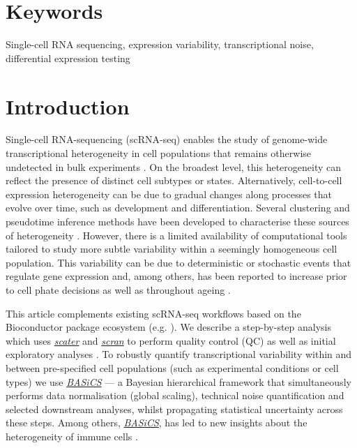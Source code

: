 \documentclass[9pt,a4paper,]{extarticle}
\begin{document}
\section*{Keywords}
Single-cell RNA sequencing, expression variability, transcriptional noise, differential expression testing


\clearpage
\pagestyle{main}

\hypertarget{introduction}{%
\section{Introduction}\label{introduction}}

Single-cell RNA-sequencing (scRNA-seq) enables the study of genome-wide
transcriptional heterogeneity in cell populations that remains otherwise
undetected in bulk experiments \citep{Stegle2015, Prakadan2017, Patange2018}.
On the broadest level, this heterogeneity can reflect the presence of distinct
cell subtypes or states.
Alternatively, cell-to-cell expression heterogeneity can be due to gradual
changes along processes that evolve over time, such as development and differentiation.
Several clustering and pseudotime inference methods have been developed to
characterise these sources of heterogeneity \citep{Kiselev2019, Saelens2019}.
However, there is a limited availability of computational tools tailored
to study more subtle variability within a seemingly homogeneous cell population.
This variability can be due to deterministic or stochastic events that regulate gene expression and, among others, has been reported to increase prior to cell phate decisions \citep{Mojtahedi2016} as well as throughout ageing \citep{Martinez-jimenez2017}.

This article complements existing scRNA-seq workflows based on the
Bioconductor package ecosystem (e.g. \citep{Lun2016, Kim2019}).
We describe a step-by-step analysis which uses \emph{\href{https://bioconductor.org/packages/3.11/scater}{scater}} and
\emph{\href{https://bioconductor.org/packages/3.11/scran}{scran}} to perform quality control (QC) as well as
initial exploratory analyses \citep{McCarthy2017, Lun2016}.
To robustly quantify transcriptional variability within and
between pre-specified cell populations (such as experimental conditions or
cell types) we use \emph{\href{https://bioconductor.org/packages/3.11/BASiCS}{BASiCS}} \citep{Vallejos2015, Vallejos2016, Eling2017} --- a Bayesian hierarchical framework that simultaneously performs
data normalisation (global scaling), technical noise quantification and selected
downstream analyses, whilst propagating statistical uncertainty across these
steps. Among others, \emph{\href{https://bioconductor.org/packages/3.11/BASiCS}{BASiCS}}, has led to new insights about the
heterogeneity of immune cells \citep{Martinez-jimenez2017}.
\end{document}
